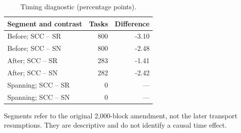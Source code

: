 \begin{table}[htbp]\centering\small
\caption{Timing diagnostic (percentage points).}
\label{tab:scc2000-timing}
\begin{tabular}{lrr}\toprule
Segment and contrast & Tasks & Difference\\\midrule
Before; SCC -- SR & 800 & -3.10\\
Before; SCC -- SN & 800 & -2.48\\
After; SCC -- SR & 283 & -1.41\\
After; SCC -- SN & 282 & -2.42\\
Spanning; SCC -- SR & 0 & ---\\
Spanning; SCC -- SN & 0 & ---\\
\bottomrule\end{tabular}
\par\smallskip\noindent Segments refer to the original 2,000-block amendment, not the later transport resumptions. They are descriptive and do not identify a causal time effect.
\end{table}
